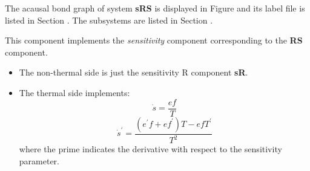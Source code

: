 

   The acausal bond graph of system \textbf{sRS} is
   displayed in Figure  and its label
   file is listed in Section .
   The subsystems are listed in Section .

   This component implements the \emph{sensitivity} component
   corresponding to the \textbf{RS} component.
   \begin{itemize}
   \item The non-thermal side is just the sensitivity R component
     \textbf{sR}.
   \item The thermal side implements:
     \begin{equation}
      \dot{s} = \frac{ef}{T}
     \end{equation}
     \begin{equation}
      {\dot{s}}^\prime = \frac{(e^\prime f + ef^\prime)T - efT^\prime }{T^2}
     \end{equation}
     where the prime indicates the derivative with respect to the
     sensitivity parameter.
   \end{itemize}
